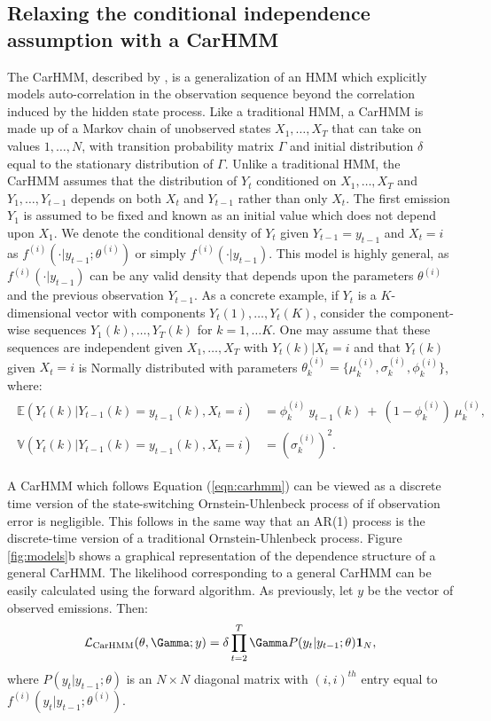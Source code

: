 \subsection{Relaxing the conditional independence assumption with a CarHMM}

The CarHMM, described by \citet{Lawler:2019}, is a generalization of an HMM which explicitly models auto-correlation in the observation sequence beyond the correlation induced by the hidden state process. Like a traditional HMM, a CarHMM is made up of a Markov chain of unobserved states $X_1,\ldots, X_T$ that can take on values $1, \ldots, N$, with transition probability matrix $\Gamma$ and initial distribution $\delta$ equal to the stationary distribution of $\Gamma$. Unlike a traditional HMM, the CarHMM assumes that the distribution of $Y_t$ conditioned on $X_1,\ldots, X_T$ and $Y_1,\ldots, Y_{t-1}$ depends on both $X_t$ and $Y_{t-1}$ rather than only $X_t$. The first emission $Y_1$ is assumed to be fixed and known as an initial value which does not depend upon $X_1$. We denote the conditional density of $Y_t$ given $Y_{t-1} = y_{t-1}$ and $X_t=i$ as $f^{(i)}(\cdot | y_{t-1}; \theta^{(i)})$ or simply $f^{(i)}(\cdot | y_{t-1})$. This model is highly general, as $f^{(i)}(\cdot | y_{t-1})$ can be any valid density that depends upon the parameters $\theta^{(i)}$ and the previous observation $Y_{t-1}$. 
As a concrete example, if $Y_t$ is a $K$-dimensional vector with components $Y_t(1),\ldots,Y_t(K)$, consider the component-wise sequences $Y_1(k), \ldots, Y_T(k)$ for $k = 1,\ldots K$. One may assume that these sequences are independent given $X_1,\ldots,X_T$ with $Y_t(k)|X_t = i$ and that $Y_t(k)$ given $X_t = i$ is Normally distributed with parameters $\theta^{(i)}_k = \{\mu^{(i)}_k,\sigma^{(i)}_k,\phi^{(i)}_k\}$, where:
%
\begin{align}
\label{eqn:carhmm}
\begin{split}
\mathbb{E}(Y_{t}(k)|Y_{t-1}(k) = y_{t-1}(k),X_t=i) &= \phi^{(i)}_k ~ y_{t-1}(k) ~+ ~(1-\phi^{(i)}_k)  ~\mu^{(i)}_k, \\
\mathbb{V}(Y_t(k)| Y_{t-1}(k) = y_{t-1}(k), X_t = i) &= (\sigma^{(i)}_k)^2.
\end{split}
\end{align}

A CarHMM which follows Equation (\ref{eqn:carhmm}) can be viewed as a discrete time version of the state-switching Ornstein-Uhlenbeck process of \citet{Michelot:2019} if observation error is negligible. This follows in the same way that an AR(1) process is the discrete-time version of a traditional Ornstein-Uhlenbeck process. Figure \ref{fig:models}b shows a graphical representation of the dependence structure of a general CarHMM. The likelihood corresponding to a general CarHMM can be easily calculated using the forward algorithm. As previously, let $y$ be the vector of observed emissions. Then:
\begin{equation*}
    \calL_{\text{CarHMM}}(\theta,\Gamma;y) = \delta \prod_{t=2}^T \Gamma P(y_t|y_{t-1};\theta) \mathbf{1}_N,
    \label{eqn:CarHMM_likelihood}
\end{equation*}
where
%
$P(y_t|y_{t-1};\theta)$ is an $N \times N$ diagonal matrix with $(i,i)^{th}$ entry equal to $f^{(i)}(y_t|y_{t-1}; \theta^{(i)})$.

